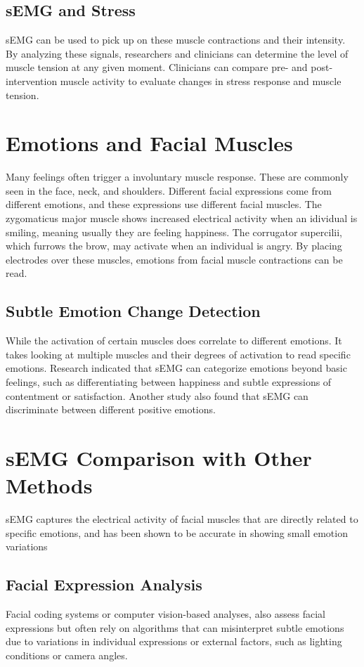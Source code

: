 \documentclass[twocolumn]{article}
\begin{document}
\subsection{sEMG and Stress}
sEMG can be used to pick up on these muscle contractions and their intensity. By analyzing these signals, researchers and clinicians can determine the level of muscle tension at any given moment. Clinicians can compare pre- and post-intervention muscle activity to evaluate changes in stress response and muscle tension. \cite{Blase_Vermetten_Lehrer_Gevirtz_2021}
\section{Emotions and Facial Muscles}
Many feelings often trigger a involuntary muscle response. These are commonly seen in the face, neck, and shoulders. Different facial expressions come from different emotions, and these expressions use different facial muscles. The zygomaticus major muscle shows increased electrical activity when an idividual is smiling, meaning usually they are feeling happiness. The corrugator supercilii, which furrows the brow, may activate when an individual is angry. By placing electrodes over these muscles, emotions from facial muscle contractions can be read. 
\cite{Mamieva_Abdusalomov_Kutlimuratov_Muminov_Whangbo_2023}
\cite{Awana_Singh_Mishra_Bhutani_Kumar_Shrivastava_2023}
\subsection{Subtle Emotion Change Detection}
While the activation of certain muscles does correlate to different emotions. It takes looking at multiple muscles and their degrees of activation to read specific emotions. Research indicated that sEMG can categorize emotions beyond basic feelings, such as differentiating between happiness and subtle expressions of contentment or satisfaction. \cite{Sato_Murata_Uraoka_Shibata_Yoshikawa_2021} Another study also found that sEMG can discriminate between different positive emotions. 
\cite{Diederiks_2021}
\section{sEMG Comparison with Other Methods}
sEMG captures the electrical activity of facial muscles that are directly related to specific emotions, and has been shown to be accurate in showing small emotion variations
\subsection{Facial Expression Analysis}
Facial coding systems or computer vision-based analyses, also assess facial expressions but often rely on algorithms that can misinterpret subtle emotions due to variations in individual expressions or external factors, such as lighting conditions or camera angles. \cite{Künecke_Hildebrandt_Recio_Sommer_2014}
\end{document}
